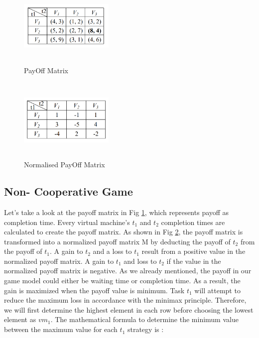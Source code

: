 \documentclass[conference]{IEEEtran}
\begin{document}
\begin{figure}[h]
  \centering
  \includegraphics[width=0.4\textwidth, height=4cm]{Figures/PayoffMatrix.png}
  \caption{PayOff Matrix\cite{patra2019game}}
  \label{Fig 3}
\end{figure}

\begin{figure}[h]
  \centering
  \includegraphics[width=0.4\textwidth, height=4cm]{Figures/Normalisedpayoff.png}
  \caption{Normalised PayOff Matrix\cite{patra2019game}}
  \label{Fig 4}
\end{figure}

\subsection{\textbf{Non- Cooperative Game}}
Let's take a look at the payoff matrix in Fig \ref{Fig 3}, which represents payoff as completion time. Every virtual machine's $t_{1}$ and $t_{2}$ completion times are calculated to create the payoff matrix. As shown in Fig \ref{Fig 4}, the payoff matrix is transformed into a normalized payoff matrix M by deducting the payoff of $t_{2}$ from the payoff of $t_{1}$.
A gain to $t_{2}$ and a loss to $t_{1}$ result from a positive value in the normalized payoff matrix. A gain to $t_{1}$ and loss to $t_{2}$ if the value in the normalized payoff matrix is negative. As we already mentioned, the payoff in our game model could either be waiting time or completion time. As a result, the gain is maximized when the payoff value is minimum. Task $t_{1}$ will attempt to reduce the maximum loss in accordance with the minimax principle. Therefore, we will first determine the highest element in each row before choosing the lowest element as $vm_{1}$. The mathematical formula to determine the minimum value between the maximum value for each $t_{1}$ strategy is :
\end{document}
